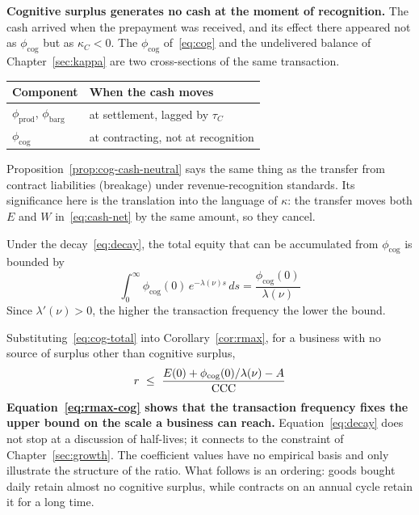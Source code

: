 \begin{example}
\textbf{Cognitive surplus generates no cash at the moment of recognition.}
The cash arrived when the prepayment was received, and its effect there appeared not as
$\phi_{\mathrm{cog}}$ but as $\kappa_C<0$. The $\phi_{\mathrm{cog}}$ of~\eqref{eq:cog} and
the undelivered balance of Chapter~\ref{sec:kappa} are two cross-sections of the same
transaction.

\begin{center}
\begin{tabularx}{\textwidth}{@{}lX@{}}
\toprule
Component & When the cash moves \\
\midrule
$\phi_{\mathrm{prod}}$, $\phi_{\mathrm{barg}}$ & at settlement, lagged by $\tau_C$ \\
$\phi_{\mathrm{cog}}$ & at contracting, not at recognition \\
\bottomrule
\end{tabularx}
\label{tab:surplus-cash-timing}
\end{center}

\begin{remark}
Proposition~\ref{prop:cog-cash-neutral} says the same thing as the transfer from contract
liabilities (breakage) under revenue-recognition standards. Its significance here is the
translation into the language of $\kappa$: the transfer moves both $E$ and $W$
in~\eqref{eq:cash-net} by the same amount, so they cancel.
\end{remark}

\begin{corollary}
\label{cor:cog-bounded}
Under the decay~\eqref{eq:decay}, the total equity that can be accumulated from
$\phi_{\mathrm{cog}}$ is bounded by
\begin{equation}
\int_0^{\infty}\phi_{\mathrm{cog}}(0)\,e^{-\lambda(\nu)s}\,ds
= \frac{\phi_{\mathrm{cog}}(0)}{\lambda(\nu)}
\label{eq:cog-total}
\end{equation}
Since $\lambda'(\nu)>0$, the higher the transaction frequency the lower the bound.
\end{corollary}

Substituting~\eqref{eq:cog-total} into Corollary~\ref{cor:rmax}, for a business with no
source of surplus other than cognitive surplus,
\begin{equation}
r \ \leq\ \frac{E(0) + \phi_{\mathrm{cog}}(0)/\lambda(\nu) - A}{\mathrm{CCC}}
\label{eq:rmax-cog}
\end{equation}
\textbf{Equation~\eqref{eq:rmax-cog} shows that the transaction frequency fixes the upper
bound on the scale a business can reach.} Equation~\eqref{eq:decay} does not stop at a
discussion of half-lives; it connects to the constraint of Chapter~\ref{sec:growth}.
The coefficient values have no empirical basis and only illustrate the structure of the
ratio. What follows is an ordering: goods bought daily retain almost no cognitive surplus,
while contracts on an annual cycle retain it for a long time.
\end{example}

